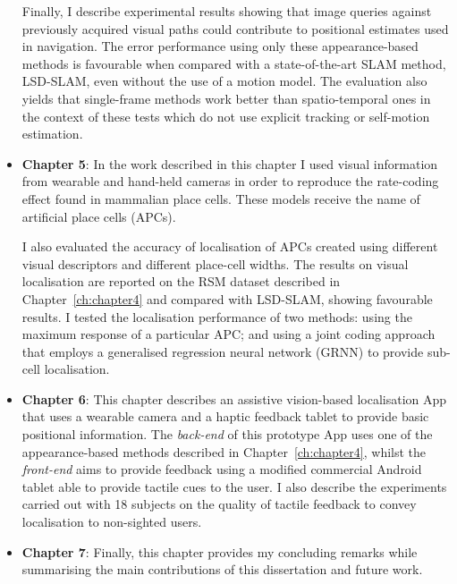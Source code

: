 \begin{itemize}
Finally, I describe experimental results showing that image queries against previously acquired visual paths could contribute to positional estimates used in navigation. The error performance using only these appearance\--based me\-thods is favourable when compared with a state\--of\--the\--art SLAM method, LSD-SLAM, even without the use of a motion model. The evaluation also yields that single-frame methods work better than spatio-temporal ones in the context of these tests which do not use explicit tracking or self-motion estimation. 

\item \textbf{Chapter 5}: In the work described in this chapter I used visual information from wearable and hand-held cameras in order to reproduce the rate-coding effect found in mammalian place cells. These models receive the name of artificial place cells (APCs). 

I also evaluated the accuracy of localisation of APCs created using different visual descriptors and different place\--cell widths. The results on visual localisation are reported on the RSM dataset described in Chapter~\ref{ch:chapter4} and compared with LSD-SLAM, showing favourable results. I tested the localisation performance of two methods: using the maximum response of a particular APC; and using a joint coding approach that employs a generalised regression neural network (GRNN) to provide sub-cell localisation.

\item \textbf{Chapter 6}: This chapter describes an assistive vision-based localisation App that uses a wearable camera and a haptic feedback tablet to provide basic positional information. The \textit{back-end} of this prototype App uses one of the appearance-based methods described in Chapter~\ref{ch:chapter4}, whilst the \textit{front-end} aims to provide feedback using a modified commercial Android tablet able to provide tactile cues to the user. I also describe the experiments carried out with 18 subjects on the quality of tactile feedback to convey localisation to non-sighted users.

\item \textbf{Chapter 7}: Finally, this chapter provides my concluding remarks while summarising the main contributions of this dissertation and future work.

\end{itemize}
